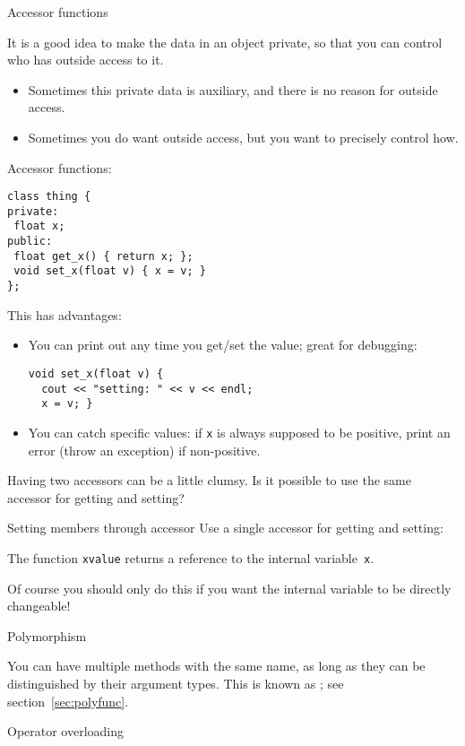 {Accessor functions}
\label{sec:cpp-accessor}

It is a good idea to make the data in an object private,
so that you can control who has outside access to it.
\begin{itemize}
\item Sometimes this private data is auxiliary, and there is no reason
  for outside access.
\item Sometimes you do want outside access, but you want to precisely
  control how.
\end{itemize}

Accessor functions:
\begin{lstlisting}
class thing {
private:
 float x;
public:
 float get_x() { return x; };
 void set_x(float v) { x = v; }
};
\end{lstlisting}
This has advantages:
\begin{itemize}
\item You can print out any time you get/set the value; great for
  debugging:
\begin{lstlisting}
void set_x(float v) {
  cout << "setting: " << v << endl;
  x = v; }
\end{lstlisting}
\item You can catch specific values: if \lstinline{x} is always supposed to be
  positive, print an error (throw an exception) if non-positive.
\end{itemize}

Having two accessors can be a little clumsy. Is it possible to use the
same accessor for getting and setting?

\begin{block}{Setting members through accessor}
  \label{sl:setmember}
  Use a single accessor for getting and setting:

  The function \lstinline{xvalue} returns a reference to the internal
  variable~\lstinline{x}.
\end{block}

Of course you should only do this if you want the internal variable to
be directly changeable!

 {Polymorphism}

You can have multiple methods with the same name, as long as they can
be distinguished by their argument types. This is known as ;
see section~\ref{sec:polyfunc}.

 {Operator overloading}
\label{sec:operatordef}

